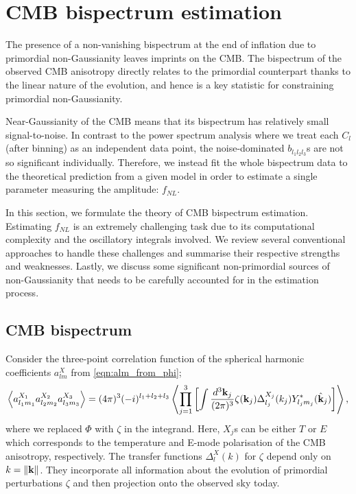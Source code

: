 \section{CMB bispectrum estimation} \label{section:CMB_bispectrum_estimation}

The presence of a non-vanishing bispectrum at the end of inflation due to primordial non-Gaussianity leaves imprints on the CMB. The bispectrum of the observed CMB anisotropy directly relates to the primordial counterpart thanks to the linear nature of the evolution, and hence is a key statistic for constraining primordial non-Gaussianity.

Near-Gaussianity of the CMB means that its bispectrum has relatively small signal-to-noise. In contrast to the power spectrum analysis where we treat each $C_l$ (after binning) as an independent data point, the noise-dominated $b_{l_1 l_2 l_3}$s are not so significant individually. Therefore, we instead fit the whole bispectrum data to the theoretical prediction from a given model in order to estimate a single parameter measuring the amplitude: $f_{NL}$.

In this section, we formulate the theory of CMB bispectrum estimation. Estimating $f_{NL}$ is an extremely challenging task due to its computational complexity and the oscillatory integrals involved. We review several conventional approaches to handle these challenges and summarise their respective strengths and weaknesses. Lastly, we discuss some significant non-primordial sources of non-Gaussianity that needs to be carefully accounted for in the estimation process.


\subsection{CMB bispectrum}

Consider the three-point correlation function of the spherical harmonic coefficients $a_{lm}^X$ from \eqref{eqn:alm_from_phi};
\begin{align}
	\left< a_{l_1 m_1}^{X_1} a_{l_2 m_2}^{X_2} a_{l_3 m_3}^{X_3}  \right> = (4\pi)^3 (-i)^{l_1 + l_2 + l_3} \left< \prod_{j=1}^{3} \left[ \int \frac{d^3\mathbf{k}_j}{(2\pi)^3} \zeta(\mathbf{k}_j)   \Delta_{l_j}^{X_j} (k_j) Y^*_{l_j m_j} (\hat{\mathbf{k}}_j) \right] \right>, \label{eqn:bispectrum_derivation_base_form}
\end{align}
where we replaced $\Phi$ with $\zeta$ in the integrand. Here, $X_j$s can be either $T$ or $E$ which corresponds to the temperature and E-mode polarisation of the CMB anisotropy, respectively. The transfer functions $\Delta_l^X (k)$ for $\zeta$ depend only on $k=\left\| \mathbf{k} \right\|$. They incorporate all information about the evolution of primordial perturbations $\zeta$ and then projection onto the observed sky today.

